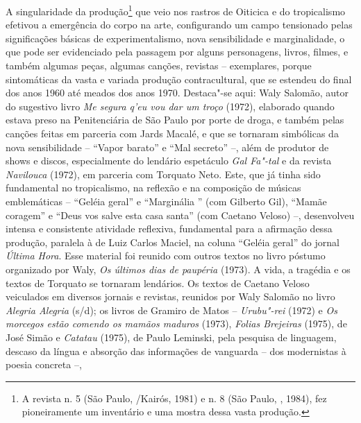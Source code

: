 A singularidade da produção\footnote{A revista {} n.
5 (São Paulo, /Kairós, 1981) e n. 8 (São Paulo, , 1984), fez
pioneiramente um inventário e uma mostra dessa vasta produção.} que
veio nos rastros de Oiticica e do tropicalismo efetivou a emergência do
corpo na arte, configurando um campo tensionado pelas significações
básicas de experimentalismo, nova sensibilidade e marginalidade, o que
pode ser evidenciado pela passagem por alguns personagens, livros,
filmes, e também algumas peças, algumas canções, revistas -- exemplares,
porque sintomáticas da vasta e variada produção contracultural, que se
estendeu do final dos anos 1960 até meados dos anos 1970. Destaca"-se
aqui: Waly Salomão, autor do sugestivo livro \emph{Me segura q'eu vou
dar um troço} (1972), elaborado quando estava preso na
Penitenciária de São Paulo por porte de droga, e também pelas canções
feitas em parceria com Jards Macalé, e que se tornaram simbólicas da
nova sensibilidade -- ``Vapor barato'' e ``Mal secreto'' --, além de
produtor de shows e discos, especialmente do lendário espetáculo
\emph{Gal Fa"-tal} e da revista \emph{Navilouca} (1972), em parceria com
Torquato Neto. Este, que já tinha sido fundamental no tropicalismo, na
reflexão e na composição de músicas emblemáticas -- ``Geléia geral'' e
``Marginália '' (com Gilberto Gil), ``Mamãe coragem'' e ``Deus vos
salve esta casa santa'' (com Caetano Veloso) --, desenvolveu intensa e
consistente atividade reflexiva, fundamental para a afirmação dessa
produção, paralela à de Luiz Carlos Maciel, na coluna ``Geléia geral''
do jornal \emph{Última Hora}. Esse material foi reunido com outros
textos no livro póstumo organizado por Waly, \emph{Os últimos dias de
paupéria} (1973). A vida, a tragédia e os textos de Torquato se tornaram
lendários. Os textos de Caetano Veloso veiculados em diversos jornais e
revistas, reunidos por Waly Salomão no livro \emph{Alegria Alegria}
(s/d); os livros de Gramiro de Matos -- \emph{Urubu"-rei} (1972) e
\emph{Os morcegos estão comendo os mamãos maduros} (1973), \emph{Folias
Brejeiras} (1975), de José Simão e \emph{Catatau} (1975), de Paulo
Leminski, pela pesquisa de linguagem, descaso da língua e absorção das
informações de vanguarda -- dos modernistas à poesia concreta --,
